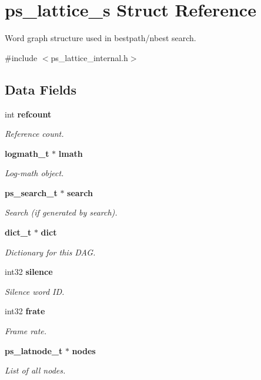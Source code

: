 \section{ps\-\_\-lattice\-\_\-s Struct Reference}
\label{structps__lattice__s}


Word graph structure used in bestpath/nbest search.  




{\ttfamily \#include $<$ps\-\_\-lattice\-\_\-internal.\-h$>$}

\subsection*{Data Fields}
\begin{DoxyCompactItemize}
\item 
int {\bf refcount}
\begin{DoxyCompactList}\small\item\em Reference count. \end{DoxyCompactList}\item 
{\bf logmath\-\_\-t} $\ast$ {\bf lmath}
\begin{DoxyCompactList}\small\item\em Log-\/math object. \end{DoxyCompactList}\item 
{\bf ps\-\_\-search\-\_\-t} $\ast$ {\bf search}
\begin{DoxyCompactList}\small\item\em Search (if generated by search). \end{DoxyCompactList}\item 
{\bf dict\-\_\-t} $\ast$ {\bf dict}
\begin{DoxyCompactList}\small\item\em Dictionary for this D\-A\-G. \end{DoxyCompactList}\item 
int32 {\bf silence}
\begin{DoxyCompactList}\small\item\em Silence word I\-D. \end{DoxyCompactList}\item 
int32 {\bf frate}
\begin{DoxyCompactList}\small\item\em Frame rate. \end{DoxyCompactList}\item 
{\bf ps\-\_\-latnode\-\_\-t} $\ast$ {\bf nodes}
\begin{DoxyCompactList}\small\item\em List of all nodes. \end{DoxyCompactList}\item 

\end{DoxyCompactItemize}
